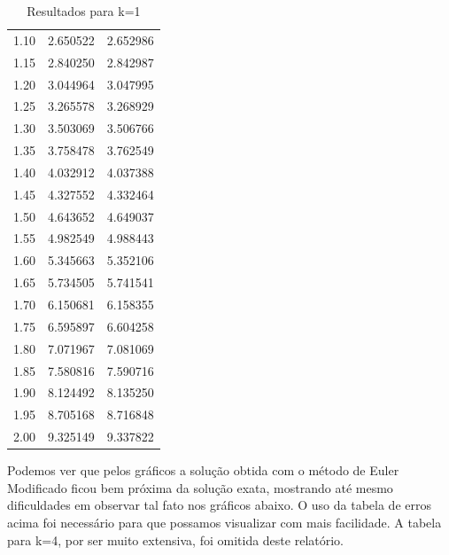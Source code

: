 \documentclass[10pt,a4paper]{article}
\begin{document}
\begin{table}[H]
\begin{tabular}{|c|c|c|}
  1.10 &        2.650522 &                 2.652986 \\ 
  1.15 &        2.840250 &                 2.842987 \\ 
  1.20 &        3.044964 &                 3.047995 \\ 
  1.25 &        3.265578 &                 3.268929 \\ 
  1.30 &        3.503069 &                 3.506766 \\ 
  1.35 &        3.758478 &                 3.762549 \\ 
  1.40 &        4.032912 &                 4.037388 \\ 
  1.45 &        4.327552 &                 4.332464 \\ 
  1.50 &        4.643652 &                 4.649037 \\ 
  1.55 &        4.982549 &                 4.988443 \\ 
  1.60 &        5.345663 &                 5.352106 \\ 
  1.65 &        5.734505 &                 5.741541 \\ 
  1.70 &        6.150681 &                 6.158355 \\ 
  1.75 &        6.595897 &                 6.604258 \\ 
  1.80 &        7.071967 &                 7.081069 \\ 
  1.85 &        7.580816 &                 7.590716 \\ 
  1.90 &        8.124492 &                 8.135250 \\ 
  1.95 &        8.705168 &                 8.716848 \\ 
  2.00 &        9.325149 &                 9.337822 \\ 
  \hline
\end{tabular}
\caption{Resultados para k=1}
\label{tab:1}
\end{table}
Podemos ver que pelos gráficos a solução obtida com o método de Euler Modificado ficou bem próxima da solução exata, mostrando até mesmo dificuldades em observar tal fato nos gráficos abaixo. O uso da tabela de erros acima foi necessário para que possamos visualizar com mais facilidade. A tabela para k=4, por ser muito extensiva, foi omitida deste relatório.
\end{document}
